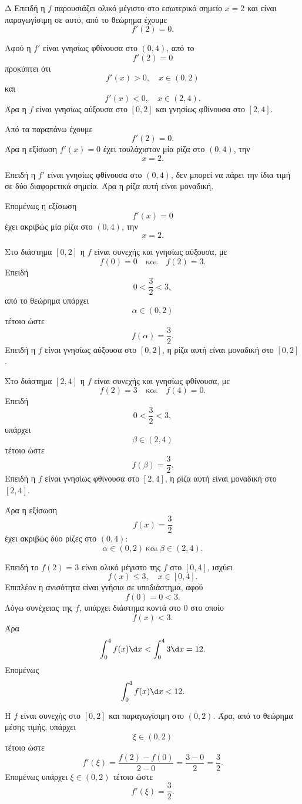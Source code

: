 \begin{thema}{Δ}
Επειδή η $f$ παρουσιάζει ολικό μέγιστο στο εσωτερικό σημείο $x=2$ και
είναι παραγωγίσιμη σε αυτό, από το θεώρημα  έχουμε
\[
f'(2)=0.
\]

Αφού η $f'$ είναι γνησίως φθίνουσα στο $(0,4)$, από το
\[
f'(2)=0
\]
προκύπτει ότι
\[
f'(x)>0,\quad x\in(0,2)
\]
και
\[
f'(x)<0,\quad x\in(2,4).
\]
Άρα η $f$ είναι γνησίως αύξουσα στο $[0,2]$ και γνησίως φθίνουσα στο
$[2,4]$.

\begin{erwthma}
\item Από τα παραπάνω έχουμε
\[
f'(2)=0.
\]
Άρα η εξίσωση $f'(x)=0$ έχει τουλάχιστον μία ρίζα στο $(0,4)$, την
\[
x=2.
\]

Επειδή η $f'$ είναι γνησίως φθίνουσα στο $(0,4)$, δεν μπορεί να πάρει
την ίδια τιμή σε δύο διαφορετικά σημεία. Άρα η ρίζα αυτή είναι μοναδική.

Επομένως η εξίσωση
\[
f'(x)=0
\]
έχει ακριβώς μία ρίζα στο $(0,4)$, την
\[
{x=2}.
\]

\item Στο διάστημα $[0,2]$ η $f$ είναι συνεχής και γνησίως αύξουσα, με
\[
f(0)=0
\quad\text{και}\quad
f(2)=3.
\]
Επειδή
\[
0<\frac32<3,
\]
από το θεώρημα  υπάρχει
\[
\alpha\in(0,2)
\]
τέτοιο ώστε
\[
f(\alpha)=\frac32.
\]
Επειδή η $f$ είναι γνησίως αύξουσα στο $[0,2]$, η ρίζα αυτή είναι
μοναδική στο $[0,2]$.

Στο διάστημα $[2,4]$ η $f$ είναι συνεχής και γνησίως φθίνουσα, με
\[
f(2)=3
\quad\text{και}\quad
f(4)=0.
\]
Επειδή
\[
0<\frac32<3,
\]
υπάρχει
\[
\beta\in(2,4)
\]
τέτοιο ώστε
\[
f(\beta)=\frac32.
\]
Επειδή η $f$ είναι γνησίως φθίνουσα στο $[2,4]$, η ρίζα αυτή είναι
μοναδική στο $[2,4]$.

Άρα η εξίσωση
\[
f(x)=\frac32
\]
έχει ακριβώς δύο ρίζες στο $(0,4)$:
\[
{\alpha\in(0,2)\ \text{και}\ \beta\in(2,4)}.
\]

\item Επειδή το $f(2)=3$ είναι ολικό μέγιστο της $f$ στο $[0,4]$,
ισχύει
\[
f(x)\leq 3,\quad x\in[0,4].
\]
Επιπλέον η ανισότητα είναι γνήσια σε υποδιάστημα, αφού
\[
f(0)=0<3.
\]
Λόγω συνέχειας της $f$, υπάρχει διάστημα κοντά στο $0$ στο οποίο
\[
f(x)<3.
\]
Άρα
\[
\int_0^4 f(x)\d x
<
\int_0^4 3\d x
=12.
\]
Επομένως
\[
{\int_0^4 f(x)\d x<12}.
\]

\item Η $f$ είναι συνεχής στο $[0,2]$ και παραγωγίσιμη στο $(0,2)$.
Άρα, από το θεώρημα μέσης τιμής, υπάρχει
\[
\xi\in(0,2)
\]
τέτοιο ώστε
\[
f'(\xi)=\frac{f(2)-f(0)}{2-0}
=\frac{3-0}{2}
=\frac32.
\]
Επομένως υπάρχει $\xi\in(0,2)$ τέτοιο ώστε
\[
{f'(\xi)=\frac32}.
\]
\end{erwthma}
\end{thema}

